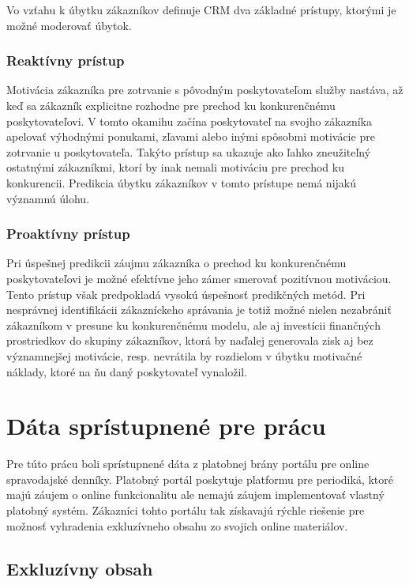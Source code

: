 Vo vzťahu k úbytku zákazníkov definuje CRM dva základné prístupy, ktorými je možné moderovať úbytok. 

\subsubsection{Reaktívny prístup}
\label{analyza_reaktivny_pristup}

Motivácia zákazníka pre zotrvanie s pôvodným poskytovateľom služby nastáva, až keď sa zákazník explicitne rozhodne pre prechod ku konkurenčnému poskytovateľovi. V tomto okamihu začína poskytovateľ na svojho zákazníka apelovať výhodnými ponukami, zľavami alebo inými spôsobmi motivácie pre zotrvanie u poskytovateľa. Takýto prístup sa ukazuje ako ľahko zneužiteľný ostatnými zákazníkmi, ktorí by inak nemali motiváciu pre prechod ku konkurencii. Predikcia úbytku zákazníkov v tomto prístupe nemá nijakú významnú úlohu.

\subsubsection{Proaktívny prístup}
\label{analyza_proaktivny_pristup}

Pri úspešnej predikcii záujmu zákazníka o prechod ku konkurenčnému poskytovateľovi je možné efektívne jeho zámer smerovať pozitívnou motiváciou. Tento prístup však predpokladá vysokú úspešnosť predikčných metód. Pri nesprávnej identifikácii zákazníckeho správania je totiž možné nielen nezabrániť zákazníkom v presune ku konkurenčnému modelu, ale aj investícii finančných prostriedkov do skupiny zákazníkov, ktorá by naďalej generovala zisk aj bez významnejšej motivácie, resp. nevrátila by rozdielom v úbytku motivačné náklady, ktoré na ňu daný poskytovateľ vynaložil.

\section{Dáta sprístupnené pre prácu}
\label{analyza_data}

Pre túto prácu boli sprístupnené dáta z platobnej brány portálu pre online spravodajské denníky. Platobný portál poskytuje platformu pre periodiká, ktoré majú záujem o online funkcionalitu ale nemajú záujem implementovať vlastný platobný systém. Zákazníci tohto portálu tak získavajú rýchle riešenie pre možnosť vyhradenia exkluzívneho obsahu zo svojich online materiálov.

\subsection{Exkluzívny obsah}
\label{analyza_exkluzivny_obsah}

